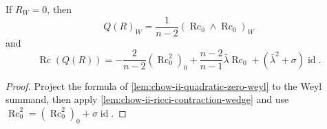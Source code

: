 \begin{corollary}
  \label{cor:chow-ii-zero-weyl-quadratic-components}
  If \(R_W=0\), then
  \[
  Q(R)_W=\frac1{n-2}(\operatorname{Rc}_0\wedge\operatorname{Rc}_0)_W
  \]
  and
  \[
  \operatorname{Rc}(Q(R))=-\frac2{n-2}(\operatorname{Rc}_0^2)_0
   +\frac{n-2}{n-1}\bar\lambda\operatorname{Rc}_0
   +(\bar\lambda^2+\sigma)\operatorname{id}.
  \]
\end{corollary}
\begin{proof}
  Project the formula of \ref{lem:chow-ii-quadratic-zero-weyl} to the Weyl
  summand, then apply \ref{lem:chow-ii-ricci-contraction-wedge} and use
  \(\operatorname{Rc}_0^2=(\operatorname{Rc}_0^2)_0+\sigma\operatorname{id}\).
\end{proof}


